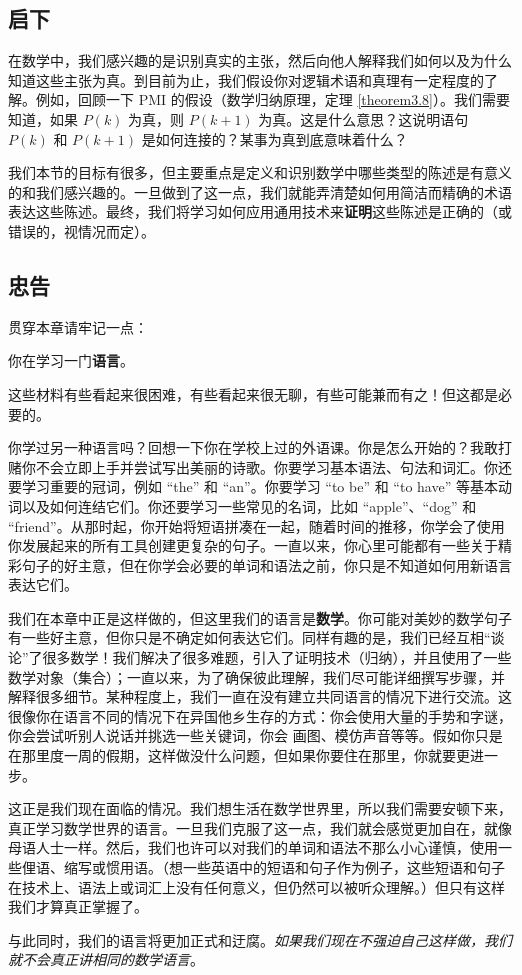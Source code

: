\subsection{启下}

在数学中，我们感兴趣的是识别真实的主张，然后向他人解释我们如何以及为什么知道这些主张为真。到目前为止，我们假设你对逻辑术语和真理有一定程度的了解。例如，回顾一下 PMI 的假设（数学归纳原理，定理 \ref{theorem3.8}）。我们需要知道，如果 $P(k)$ 为真，则 $P(k+1)$ 为真。这是什么意思？这说明语句 $P(k)$ 和 $P(k + 1)$ 是如何连接的？某事为真到底意味着什么？

我们本节的目标有很多，但主要重点是定义和识别数学中哪些类型的陈述是有意义的和我们感兴趣的。一旦做到了这一点，我们就能弄清楚如何用简洁而精确的术语表达这些陈述。最终，我们将学习如何应用通用技术来\textbf{证明}这些陈述是正确的（或错误的，视情况而定）。

\subsection{忠告}

贯穿本章请牢记一点：

\begin{center}
    你在学习一门\textbf{语言}。
\end{center}

这些材料有些看起来很困难，有些看起来很无聊，有些可能兼而有之！但这都是必要的。

你学过另一种语言吗？回想一下你在学校上过的外语课。你是怎么开始的？我敢打赌你不会立即上手并尝试写出美丽的诗歌。你要学习基本语法、句法和词汇。你还要学习重要的冠词，例如 ``the'' 和 ``an''。你要学习 ``to be'' 和 ``to have'' 等基本动词以及如何连结它们。你还要学习一些常见的名词，比如 ``apple''、``dog'' 和 ``friend''。从那时起，你开始将短语拼凑在一起，随着时间的推移，你学会了使用你发展起来的所有工具创建更复杂的句子。一直以来，你心里可能都有一些关于精彩句子的好主意，但在你学会必要的单词和语法之前，你只是不知道如何用新语言表达它们。

我们在本章中正是这样做的，但这里我们的语言是\textbf{数学}。你可能对美妙的数学句子有一些好主意，但你只是不确定如何表达它们。同样有趣的是，我们已经互相``谈论''了很多数学！我们解决了很多难题，引入了证明技术（归纳），并且使用了一些数学对象（集合）；一直以来，为了确保彼此理解，我们尽可能详细撰写步骤，并解释很多细节。某种程度上，我们一直在没有建立共同语言的情况下进行交流。这很像你在语言不同的情况下在异国他乡生存的方式：你会使用大量的手势和字谜，你会尝试听别人说话并挑选一些关键词，你会 画图、模仿声音等等。假如你只是在那里度一周的假期，这样做没什么问题，但如果你要住在那里，你就要更进一步。

这正是我们现在面临的情况。我们想生活在数学世界里，所以我们需要安顿下来，真正学习数学世界的语言。一旦我们克服了这一点，我们就会感觉更加自在，就像母语人士一样。然后，我们也许可以对我们的单词和语法不那么小心谨慎，使用一些俚语、缩写或惯用语。（想一些英语中的短语和句子作为例子，这些短语和句子在技术上、语法上或词汇上没有任何意义，但仍然可以被听众理解。）但只有这样我们才算真正掌握了。

与此同时，我们的语言将更加正式和迂腐。\emph{如果我们现在不强迫自己这样做，我们就不会真正讲相同的数学语言}。